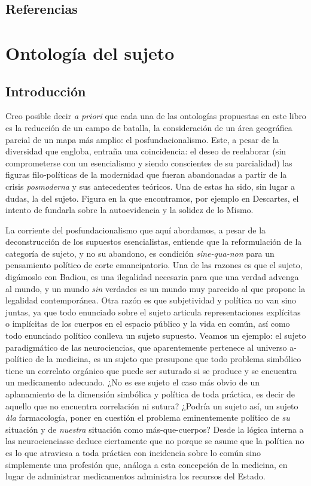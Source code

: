 \section*{Referencias}
\printbibliography[heading=none]   %


\chapter{Ontología del sujeto}


\section{Introducción}

Creo posible decir \emph{a priori} que cada una de las ontologías propuestas en este libro es la reducción de un campo de batalla, la consideración de un área geográfica parcial de un mapa más amplio: el posfundacionalismo. Este, a pesar de la diversidad que engloba, entraña una coincidencia: el deseo de reelaborar (sin comprometerse con un esencialismo y siendo conscientes de su parcialidad) las figuras filo-políticas de la modernidad que fueran abandonadas a partir de la crisis \emph{posmoderna} y sus antecedentes teóricos. Una de estas ha sido, sin lugar a dudas, la del sujeto. Figura en la que encontramos, por ejemplo en Descartes, el intento de fundarla sobre la autoevidencia y la solidez de lo Mismo.

La corriente del posfundacionalismo que aquí abordamos, a pesar de la deconstrucción de los supuestos esencialistas, entiende que la reformulación de la categoría de sujeto, y no su abandono, es condición \emph{sine-qua-non} para un pensamiento político de corte emancipatorio. Una de las razones es que el sujeto, digámoslo con Badiou, es una ilegalidad necesaria para que una verdad advenga al mundo, y un mundo \emph{sin} verdades es un mundo muy parecido al que propone la legalidad contemporánea. Otra razón es que subjetividad y política no van sino juntas, ya que todo enunciado sobre el sujeto articula representaciones explícitas o implícitas de los cuerpos en el espacio público y la vida en común, así como todo enunciado político conlleva un sujeto supuesto. Veamos un ejemplo: el sujeto paradigmático de las neurociencias, que aparentemente pertenece al universo a-político de la medicina, es un sujeto que presupone que todo problema simbólico tiene un correlato orgánico que puede ser suturado si se produce y se encuentra un medicamento adecuado. ¿No es ese sujeto el caso más obvio de un aplanamiento de la dimensión simbólica y política de toda práctica, es decir de aquello que no encuentra correlación ni sutura? ¿Podría un sujeto así, un sujeto \emph{àla} farmacología, poner en cuestión el problema eminentemente político de \emph{su} situación y de \emph{nuestra} situación como más-que-cuerpos? Desde la lógica interna a las neurocienciasse deduce ciertamente que no porque se asume que la política no es lo que atraviesa a toda práctica con incidencia sobre lo común sino simplemente una profesión que, análoga a esta concepción de la medicina, en lugar de administrar medicamentos administra los recursos del Estado.

